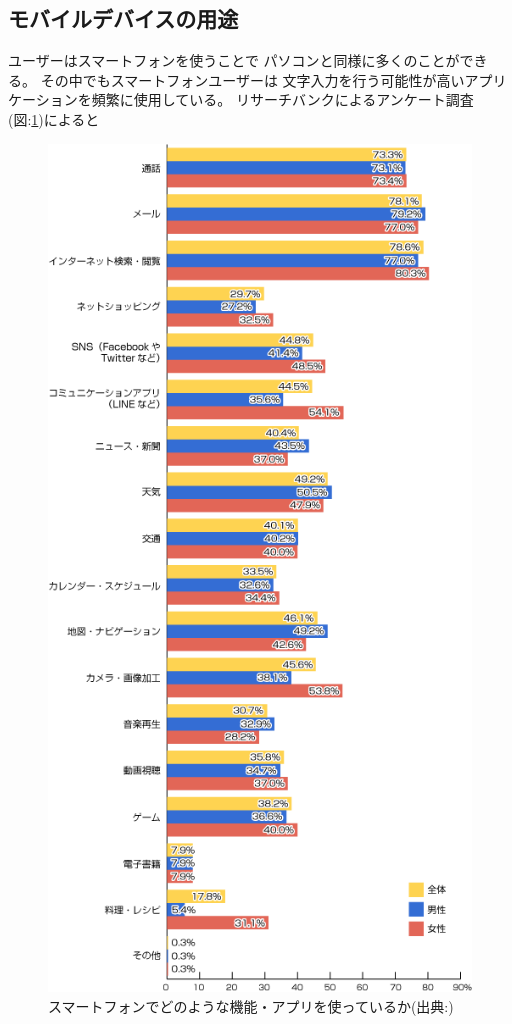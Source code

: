 \subsection{モバイルデバイスの用途}
ユーザーはスマートフォンを使うことで
パソコンと同様に多くのことができる。
その中でもスマートフォンユーザーは
文字入力を行う可能性が高いアプリケーションを頻繁に使用している。
リサーチバンクによるアンケート調査\cite{researchbanksmartphone}
(図:\ref{fig:purpose})によると
\begin{figure}[htbp]
  \begin{center}
    \includegraphics[width=115mm,bb=0 0 500 1001]{images/purpose.png}
  \end{center}
  \caption{スマートフォンでどのような機能・アプリを使っているか(出典:\cite{researchbanksmartphone})}
  \label{fig:purpose}
\end{figure}
